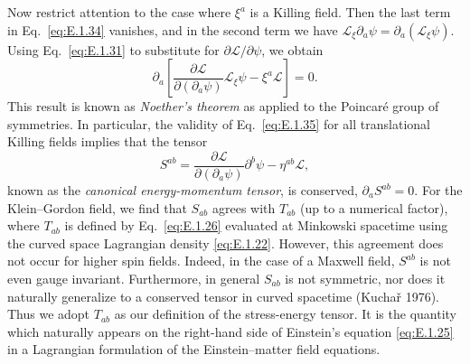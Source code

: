 Now restrict attention to the case where \(\xi^a\) is a Killing field. Then the
last term in Eq.~\eqref{eq:E.1.34} vanishes, and in the second term we have
\(\mathcal L_\xi\partial_a\psi=\partial_a(\mathcal L_\xi\psi)\). Using
Eq.~\eqref{eq:E.1.31} to substitute for
\(\partial\mathcal L/\partial\psi\), we obtain
\begin{equation}
  \partial_a\left[
    \frac{\partial\mathcal L}{\partial(\partial_a\psi)}\mathcal L_\xi\psi
    -\xi^a\mathcal L\right]=0.
  \tag{E.1.35}\label{eq:E.1.35}
\end{equation}
This result is known as \emph{Noether's theorem} as applied to the Poincaré group
of symmetries. In particular, the validity of Eq.~\eqref{eq:E.1.35} for all
translational Killing fields implies that the tensor
\begin{equation}
  S^{ab}=\frac{\partial\mathcal L}{\partial(\partial_a\psi)}
    \partial^b\psi-\eta^{ab}\mathcal L,
  \tag{E.1.36}\label{eq:E.1.36}
\end{equation}
known as the \emph{canonical energy-momentum tensor}, is conserved,
\(\partial_aS^{ab}=0\). For the Klein--Gordon field, we find that \(S_{ab}\) agrees
with \(T_{ab}\) (up to a numerical factor), where \(T_{ab}\) is defined by
Eq.~\eqref{eq:E.1.26} evaluated at Minkowski spacetime using the curved space
Lagrangian density \eqref{eq:E.1.22}. However, this agreement does not occur for
higher spin fields. Indeed, in the case of a Maxwell field, \(S^{ab}\) is not even
gauge invariant. Furthermore, in general \(S_{ab}\) is not symmetric, nor does it
naturally generalize to a conserved tensor in curved spacetime (Kuchař 1976). Thus
we adopt \(T_{ab}\) as our definition of the stress-energy tensor. It is the quantity
which naturally appears on the right-hand side of Einstein's equation
\eqref{eq:E.1.25} in a Lagrangian formulation of the Einstein--matter field
equations.

